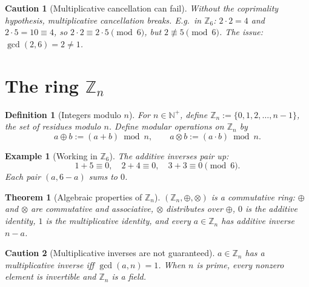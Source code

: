 \documentclass[11pt]{article}
\theoremstyle{defstyle}
\newtheorem{definition}{Definition}[section]
\theoremstyle{thmstyle}
\newtheorem{theorem}{Theorem}[section]
\theoremstyle{notstyle}
\newtheorem*{example}{Example}
\theoremstyle{cautionstyle}
\newtheorem*{caution}{Caution}
\newcommand{\Z}{\mathbb{Z}}
\newcommand{\Zn}{\mathbb{Z}_n}
\newcommand{\Np}{\mathbb{N}^{+}}
\begin{document}
\begin{cautionbox}
\begin{caution}[Multiplicative cancellation can fail]
Without the coprimality hypothesis, multiplicative cancellation breaks.
E.g.\ in $\Z_6$: $2 \cdot 2 = 4$ and $2 \cdot 5 = 10 \equiv 4$, so
$2 \cdot 2 \equiv 2 \cdot 5 \pmod 6$, but $2 \not\equiv 5 \pmod 6$.  The
issue: $\gcd(2, 6) = 2 \neq 1$.
\end{caution}
\end{cautionbox}

\section{The ring \texorpdfstring{$\Zn$}{Z\_n}}

\begin{defbox}
\begin{definition}[Integers modulo $n$]
For $n \in \Np$, define $\Zn := \{0, 1, 2, \ldots, n-1\}$, the set of
\emph{residues} modulo $n$.  Define modular operations on $\Zn$ by
\[
  a \oplus b := (a + b) \bmod n,
  \qquad
  a \otimes b := (a \cdot b) \bmod n.
\]
\end{definition}
\end{defbox}

\begin{notebox}
\begin{example}[Working in $\Z_6$]
The additive inverses pair up:
\[
  1+5 \equiv 0,\quad 2+4 \equiv 0,\quad 3+3 \equiv 0 \pmod 6.
\]
Each pair $(a, 6-a)$ sums to $0$.
\end{example}
\end{notebox}

\begin{thmbox}
\begin{theorem}[Algebraic properties of $\Zn$]
$(\Zn, \oplus, \otimes)$ is a \emph{commutative ring}: $\oplus$ and
$\otimes$ are commutative and associative, $\otimes$ distributes over
$\oplus$, $0$ is the additive identity, $1$ is the multiplicative
identity, and every $a \in \Zn$ has additive inverse $n - a$.
\end{theorem}
\end{thmbox}

\begin{cautionbox}
\begin{caution}[Multiplicative inverses are not guaranteed]
$a \in \Zn$ has a multiplicative inverse iff $\gcd(a, n) = 1$.  When $n$
is prime, every nonzero element is invertible and $\Zn$ is a \emph{field}.
\end{caution}
\end{cautionbox}
\end{document}

